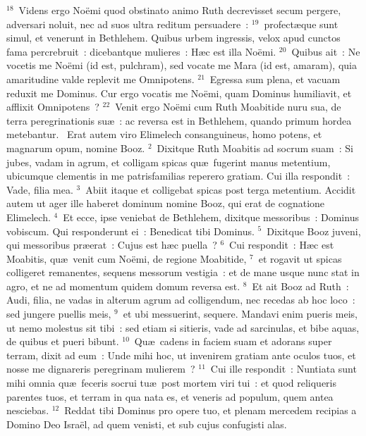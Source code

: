 ${}^{18}$~Videns ergo No\"emi quod obstinato animo Ruth decrevisset secum pergere, adversari noluit, nec ad suos ultra reditum persuadere~:
${}^{19}$~profect\ae que sunt simul, et venerunt in Bethlehem. Quibus urbem ingressis, velox apud cunctos fama percrebruit~: dicebantque mulieres~: H\ae c est illa No\"emi.
${}^{20}$~Quibus ait~: Ne vocetis me No\"emi (id est, pulchram), sed vocate me Mara (id est, amaram), quia amaritudine valde replevit me Omnipotens.
${}^{21}$~Egressa sum plena, et vacuam reduxit me Dominus. Cur ergo vocatis me No\"emi, quam Dominus humiliavit, et afflixit Omnipotens~?
${}^{22}$~Venit ergo No\"emi cum Ruth Moabitide nuru sua, de terra peregrinationis su\ae~: ac reversa est in Bethlehem, quando primum hordea metebantur.
~\lettrine[lines=10,image=true,loversize=0.05,lraise=-0.03]{E}{}rat autem viro Elimelech consanguineus, homo potens, et magnarum opum, nomine Booz.
${}^{2}$~Dixitque Ruth Moabitis ad socrum suam~: Si jubes, vadam in agrum, et colligam spicas qu\ae\ fugerint manus metentium, ubicumque clementis in me patrisfamilias reperero gratiam. Cui illa respondit~: Vade, filia mea.
${}^{3}$~Abiit itaque et colligebat spicas post terga metentium. Accidit autem ut ager ille haberet dominum nomine Booz, qui erat de cognatione Elimelech.
${}^{4}$~Et ecce, ipse veniebat de Bethlehem, dixitque messoribus~: Dominus vobiscum. Qui responderunt ei~: Benedicat tibi Dominus.
${}^{5}$~Dixitque Booz juveni, qui messoribus pr\ae erat~: Cujus est h\ae c puella~?
${}^{6}$~Cui respondit~: H\ae c est Moabitis, qu\ae\ venit cum No\"emi, de regione Moabitide,
${}^{7}$~et rogavit ut spicas colligeret remanentes, sequens messorum vestigia~: et de mane usque nunc stat in agro, et ne ad momentum quidem domum reversa est.
${}^{8}$~Et ait Booz ad Ruth~: Audi, filia, ne vadas in alterum agrum ad colligendum, nec recedas ab hoc loco~: sed jungere puellis meis,
${}^{9}$~et ubi messuerint, sequere. Mandavi enim pueris meis, ut nemo molestus sit tibi~: sed etiam si sitieris, vade ad sarcinulas, et bibe aquas, de quibus et pueri bibunt.
${}^{10}$~Qu\ae\ cadens in faciem suam et adorans super terram, dixit ad eum~: Unde mihi hoc, ut invenirem gratiam ante oculos tuos, et nosse me dignareris peregrinam mulierem~?
${}^{11}$~Cui ille respondit~: Nuntiata sunt mihi omnia qu\ae\ feceris socrui tu\ae\ post mortem viri tui~: et quod reliqueris parentes tuos, et terram in qua nata es, et veneris ad populum, quem antea nesciebas.
${}^{12}$~Reddat tibi Dominus pro opere tuo, et plenam mercedem recipias a Domino Deo Isra\"el, ad quem venisti, et sub cujus confugisti alas.
